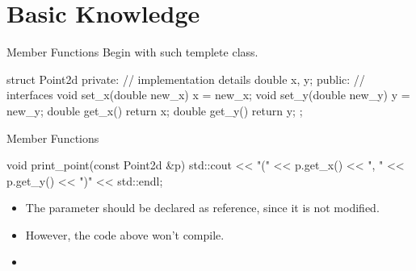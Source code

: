 \documentclass{beamer}
\begin{document}
\section{Basic Knowledge}


\begin{frame}[fragile]{\const Member Functions}
    Begin with such templete class.
    \begin{cpp}
struct Point2d {
 private:
  // implementation details
  double x, y;
 public:
  // interfaces
  void set_x(double new_x)
    { x = new_x; }
  void set_y(double new_y)
    { y = new_y; }
  double get_x()
    { return x; }
  double get_y()
    { return y; }
};
    \end{cpp}
\end{frame}

\begin{frame}[fragile]{\const Member Functions}    
    \begin{cpp}
void print_point(const Point2d &p) {
  std::cout << "(" << p.get_x() << ", "
            << p.get_y() << ")" << std::endl;
}
    \end{cpp}
    \begin{itemize}
        \item The parameter should be declared as \const reference, since it is not modified.
        \item However, the code above won't compile.
        \item {}
    \end{itemize}
\end{frame}
\end{document}
